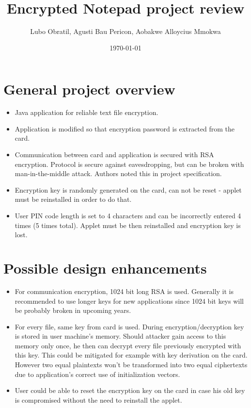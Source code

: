\documentclass[letterpaper]{article}
\title{Encrypted Notepad project review}
\author{Lubo Obratil, Agusti Bau Pericon, Aobakwe Alloycius Mmokwa}
\date{\today}
\begin{document}
\maketitle

\section{General project overview}
\begin{itemize}
\item Java application for reliable text file encryption.
\item Application is modified so that encryption password is extracted from the card.
\item Communication between card and application is secured with RSA encryption. Protocol is secure against eavesdropping, but can be broken with man-in-the-middle attack. Authors noted this in project specification.
\item Encryption key is randomly generated on the card, can not be reset - applet must be reinstalled in order to do that.
\item User PIN code length is set to 4 characters and can be incorrectly entered 4 times (5 times total). Applet must be then reinstalled and encryption key is lost.
\end{itemize}

\section{Possible design enhancements}
\begin{itemize}
\item For communication encryption, 1024 bit long RSA is used. Generally it is recommended to use longer keys for new applications since 1024 bit keys will be probably broken in upcoming years.
\item For every file, same key from card is used. During encryption/decryption key is stored in user machine's memory. Should attacker gain access to this memory only once, he then can decrypt every file previously encrypted with this key. This could be mitigated for example with key derivation on the card. However two equal plaintexts won't be transformed into two equal ciphertexts due to application's correct use of initialization vectors.
\item User could be able to reset the encryption key on the card in case his old key is compromised without the need to reinstall the applet.
\end{itemize}
\end{document}
